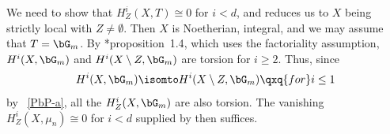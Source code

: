 \bpf
We need to show that $H^i_Z(X, T) \cong 0$ for $i < d$, and  reduces us to $X$ being strictly local with $Z \neq \emptyset$. %
Then $X$ is Noetherian, integral, and we may assume that $T = \bG_m$. By \cite{Gro68b}*{proposition~1.4}, which uses the factoriality assumption, $H^i(X, \bG_m)$ and $H^i(X\setminus Z, \bG_m)$ are torsion for $i \ge 2$. Thus, since
\[
H^i(X, \bG_m) \isomto H^i(X\setminus Z, \bG_m) \qxq{for} i \le 1
\]
by ~\ref{PbP-a}, all the $H^{i}_Z(X, \bG_m)$ are also torsion. The vanishing $H^i_Z(X, \mu_n) \cong 0$ for $i < d$ supplied by  then suffices.
\epf







































%






\begin{bibdiv}
\begin{biblist}


\end{biblist}
\end{bibdiv}
